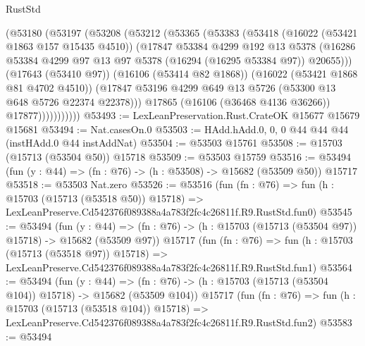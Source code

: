 \begin{lexlean}{RustStd}
\begin{coremodule}
                (@53180
                  (@53197
                    (@53208
                      (@53212
                        (@53365
                          (@53383
                            (@53418
                              (@16022 (@53421 @1863 @157 @15435 @4510))
                              (@17847
                                @53384
                                @4299
                                @192
                                @13
                                @5378
                                (@16286
                                  @53384
                                  @4299
                                  @97
                                  @13
                                  @97
                                  @5378
                                  (@16294 (@16295 @53384 @97))
                                  @20655)))
                            (@17643 (@53410 @97))
                            (@16106 (@53414 @82 @1868))
                            (@16022 (@53421 @1868 @81 @4702 @4510))
                            (@17847
                              @53196
                              @4299
                              @649
                              @13
                              @5726
                              (@53300 @13 @648 @5726 @22374 @22378)))
                          @17865
                          (@16106 (@36468 @4136 @36266))
                          @17877)))))))))))
@53493 := LexLeanPreservation.Rust.CrateOK @15677 @15679 @15681
@53494 := Nat.casesOn.{0}
@53503 := HAdd.hAdd.{0, 0, 0} @44 @44 @44 (instHAdd.{0} @44 instAddNat)
@53504 := @53503 @15761
@53508 := @15703 (@15713 (@53504 @50)) @15718
@53509 := @53503 @15759
@53516 := @53494 (fun (y : @44) => (fn : @76) -> (h : @53508) -> @15682 (@53509 @50)) @15717
@53518 := @53503 Nat.zero
@53526 := @53516
    (fun (fn : @76) =>
    fun (h : @15703 (@15713 (@53518 @50)) @15718) =>
    LexLeanPreserve.Cd542376f089388a4a783f2fc4c26811f.R9.RustStd.fun0)
@53545 := @53494
    (fun (y : @44) =>
    (fn : @76) -> (h : @15703 (@15713 (@53504 @97)) @15718) -> @15682 (@53509 @97))
    @15717
    (fun (fn : @76) =>
    fun (h : @15703 (@15713 (@53518 @97)) @15718) =>
    LexLeanPreserve.Cd542376f089388a4a783f2fc4c26811f.R9.RustStd.fun1)
@53564 := @53494
    (fun (y : @44) =>
    (fn : @76) -> (h : @15703 (@15713 (@53504 @104)) @15718) -> @15682 (@53509 @104))
    @15717
    (fun (fn : @76) =>
    fun (h : @15703 (@15713 (@53518 @104)) @15718) =>
    LexLeanPreserve.Cd542376f089388a4a783f2fc4c26811f.R9.RustStd.fun2)
@53583 := @53494

\end{coremodule}
\end{lexlean}
